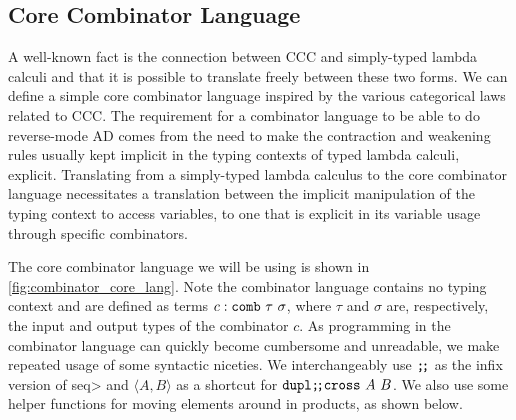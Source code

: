 \subsection{Core Combinator Language}\label{sec:combinator-core}
  A well-known fact is the connection between CCC and simply-typed lambda calculi and that it is possible to translate freely between these two forms\cite{10.1007/3-540-15198-2_10}.
  We can define a simple core combinator language inspired by the various categorical laws related to CCC.
  The requirement for a combinator language to be able to do reverse-mode AD comes from the need to make the contraction and weakening rules usually kept implicit in the typing contexts of typed lambda calculi, explicit.
  Translating from a simply-typed lambda calculus to the core combinator language necessitates a translation between the implicit manipulation of the typing context to access variables, to one that is explicit in its variable usage through specific combinators.

  The core combinator language we will be using is shown in \cref{fig:combinator_core_lang}.
  Note the combinator language contains no typing context and are defined as terms $c : \texttt{comb}\ \tau\ \sigma$, where $\tau$ and $\sigma$ are, respectively, the input and output types of the combinator $c$.
  As programming in the combinator language can quickly become cumbersome and unreadable, we make repeated usage of some syntactic niceties.
  We interchangeably use $\texttt{;\!;}$ as the infix version of \<seq> and $\langle A, B\rangle$ as a shortcut for $\texttt{dupl} \texttt{;\!;} \texttt{cross}\ A\ B$.
  We also use some helper functions for moving elements around in products, as shown below.

